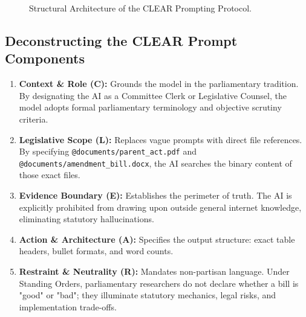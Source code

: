 \documentclass[11pt, a4paper]{report}
\begin{document}
\begin{figure}[htbp]
  \centering
  \caption{Structural Architecture of the CLEAR Prompting Protocol.}
  \label{fig:clear_framework}
\end{figure}

\subsection{Deconstructing the CLEAR Prompt Components}
\begin{enumerate}[label=\textbf{\arabic*.}]
    \item \textbf{Context \& Role (C):} Grounds the model in the parliamentary tradition. By designating the AI as a Committee Clerk or Legislative Counsel, the model adopts formal parliamentary terminology and objective scrutiny criteria.
    \item \textbf{Legislative Scope (L):} Replaces vague prompts with direct file references. By specifying \texttt{@documents/parent\_act.pdf} and \texttt{@documents/amendment\_bill.docx}, the AI searches the binary content of those exact files.
    \item \textbf{Evidence Boundary (E):} Establishes the perimeter of truth. The AI is explicitly prohibited from drawing upon outside general internet knowledge, eliminating statutory hallucinations.
    \item \textbf{Action \& Architecture (A):} Specifies the output structure: exact table headers, bullet formats, and word counts.
    \item \textbf{Restraint \& Neutrality (R):} Mandates non-partisan language. Under Standing Orders, parliamentary researchers do not declare whether a bill is "good" or "bad"; they illuminate statutory mechanics, legal risks, and implementation trade-offs.
\end{enumerate}
\end{document}
